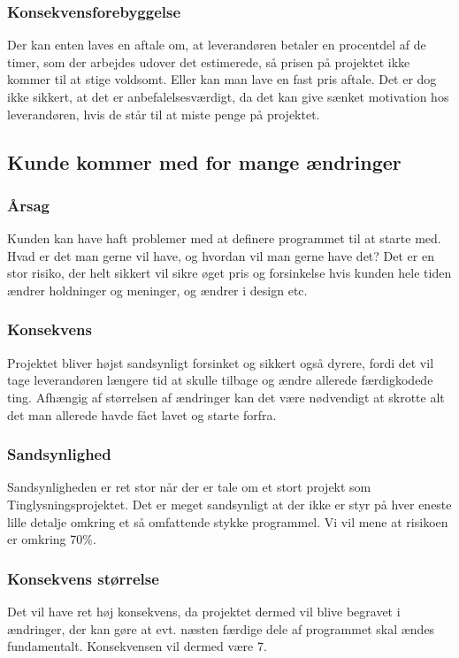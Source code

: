 \documentclass[10pt,a4paper,danish]{article}
\begin{document}
\subsubsection{Konsekvensforebyggelse}
Der kan enten laves en aftale om, at leverandøren betaler en procentdel af de timer, som der arbejdes udover det estimerede, så prisen på projektet ikke kommer til at stige voldsomt.
Eller kan man lave en fast pris aftale. Det er dog ikke sikkert, at det er anbefalelsesværdigt, da det kan give sænket motivation hos leverandøren, hvis de står til at miste penge på projektet.


\subsection{Kunde kommer med for mange ændringer}
\subsubsection{Årsag}
Kunden kan have haft problemer med at definere programmet til at starte med. Hvad er det man gerne vil have, og hvordan vil man gerne have det? Det er en stor risiko, der helt sikkert vil sikre øget pris og forsinkelse hvis kunden hele tiden ændrer holdninger og meninger, og ændrer i design etc.

\subsubsection{Konsekvens}
Projektet bliver højst sandsynligt forsinket og sikkert også dyrere, fordi det vil tage leverandøren længere tid at skulle tilbage og ændre allerede færdigkodede ting. Afhængig af størrelsen af ændringer kan det være nødvendigt at skrotte alt det man allerede havde fået lavet og starte forfra.

\subsubsection{Sandsynlighed}
Sandsynligheden er ret stor når der er tale om et stort projekt som Tinglysningsprojektet. Det er meget sandsynligt at der ikke er styr på hver eneste lille detalje omkring et så omfattende stykke programmel. Vi vil mene at risikoen er omkring 70\%.

\subsubsection{Konsekvens størrelse}
Det vil have ret høj konsekvens, da projektet dermed vil blive begravet i ændringer, der kan gøre at evt. næsten færdige dele af programmet skal ændes fundamentalt. Konsekvensen vil dermed være 7.
\end{document}
